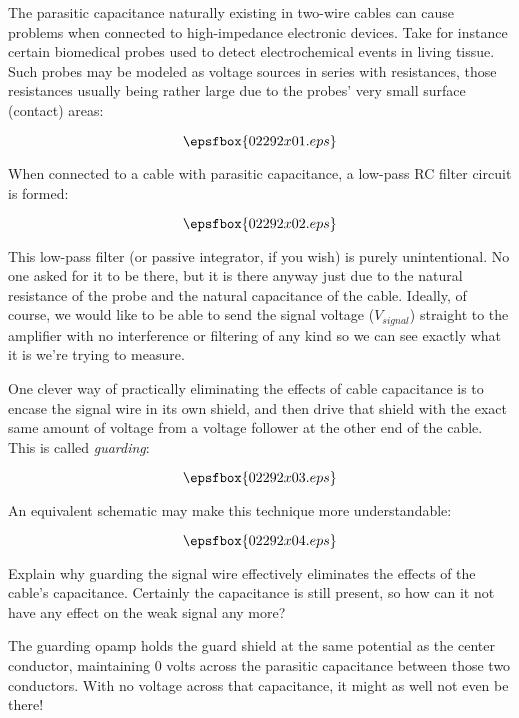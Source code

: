 

The parasitic capacitance naturally existing in two-wire cables can cause problems when connected to high-impedance electronic devices.  Take for instance certain biomedical probes used to detect electrochemical events in living tissue.  Such probes may be modeled as voltage sources in series with resistances, those resistances usually being rather large due to the probes' very small surface (contact) areas:

$$\epsfbox{02292x01.eps}$$

When connected to a cable with parasitic capacitance, a low-pass RC filter circuit is formed:

$$\epsfbox{02292x02.eps}$$

This low-pass filter (or passive integrator, if you wish) is purely unintentional.  No one asked for it to be there, but it is there anyway just due to the natural resistance of the probe and the natural capacitance of the cable.  Ideally, of course, we would like to be able to send the signal voltage ($V_{signal}$) straight to the amplifier with no interference or filtering of any kind so we can see exactly what it is we're trying to measure.

One clever way of practically eliminating the effects of cable capacitance is to encase the signal wire in its own shield, and then drive that shield with the exact same amount of voltage from a voltage follower at the other end of the cable.  This is called {\it guarding}:

$$\epsfbox{02292x03.eps}$$

\goodbreak

An equivalent schematic may make this technique more understandable:

$$\epsfbox{02292x04.eps}$$

Explain why guarding the signal wire effectively eliminates the effects of the cable's capacitance.  Certainly the capacitance is still present, so how can it not have any effect on the weak signal any more?







The guarding opamp holds the guard shield at the same potential as the center conductor, maintaining 0 volts across the parasitic capacitance between those two conductors.  With no voltage across that capacitance, it might as well not even be there!

